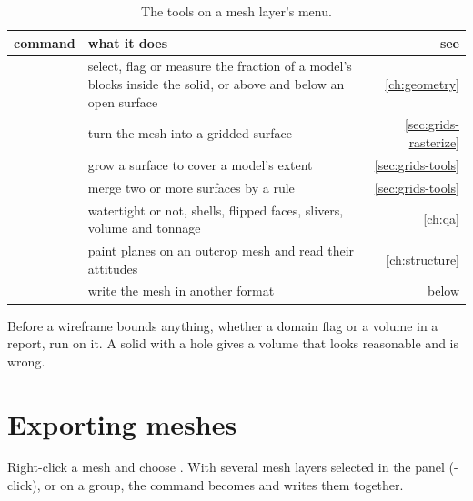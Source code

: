 \begin{table}[htbp]
\small
\begin{tabularx}{\linewidth}{@{}lMD@{}}\toprule
command & what it does & see \\ \midrule
{} & select, flag or measure the fraction of a model's blocks inside the solid, or above and below an open surface & \cref{ch:geometry} \\
 & turn the mesh into a gridded surface & \cref{sec:grids-rasterize} \\
 & grow a surface to cover a model's extent & \cref{sec:grids-tools} \\
 & merge two or more surfaces by a rule & \cref{sec:grids-tools} \\
 & watertight or not, shells, flipped faces, slivers, volume and tonnage & \cref{ch:qa} \\
 & paint planes on an outcrop mesh and read their attitudes & \cref{ch:structure} \\
 & write the mesh in another format & below \\
\bottomrule
\end{tabularx}
\caption{The tools on a mesh layer's menu.}\label{tab:meshes-tools}
\end{table}

\begin{tip}
Before a wireframe bounds anything, whether a domain flag or a volume in a report, run  on it. A solid with a hole gives a volume that looks reasonable and is wrong.
\end{tip}

\section{Exporting meshes}\label{sec:meshes-export}

Right-click a mesh and choose . With several mesh layers selected in the panel (-click), or on a group, the command becomes  and writes them together.

